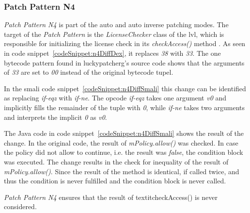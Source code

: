 \subsubsection{Patch Pattern N4}
 \textit{Patch Pattern N4} is part of the auto and auto inverse patching modes.
The target of the \textit{Patch Pattern} is the \textit{LicenseChecker} class of the \gls{lvl}, which is responsible for initializing the license check in its \textit{checkAccess()} method \cite{developersLicensingReference}.
\newline
As seen in code snippet~\ref{codeSnippet:n4DiffDex}, it replaces \textit{38} with \textit{33}.
The one bytecode pattern found in \gls{luckypatcherg}’s source code shows that the arguments of \textit{33} are set to \textit{00} instead of the original bytecode tupel.
\newline

In the smali code snippet~\ref{codeSnippet:n4DiffSmali} this change can be identified as replacing \textit{if-eqz} with \textit{if-ne}.
The opcode \textit{if-eqz} takes one argument \textit{v0} and implicitly fills the remainder of the tuple with \textit{0}, while \textit{if-ne} takes two arguments and interprets the implicit \textit{0} as \textit{v0}.
\newline

The Java code in code snippet~\ref{codeSnippet:n4DiffSmali} shows the result of the change.
In the original code, the result of \textit{mPolicy.allow()} was checked.
In case the policy did not allow to continue, i.e. the result was \textit{false}, the condition block was executed.
The change results in the check for inequality of the result of \textit{mPolicy.allow()}.
Since the result of the method is identical, if called twice, and thus the condition is never fulfilled and the condition block is never called.
\newline

\textit{Patch Pattern N4} ensures that the result of textit{checkAccess()} is never considered.


